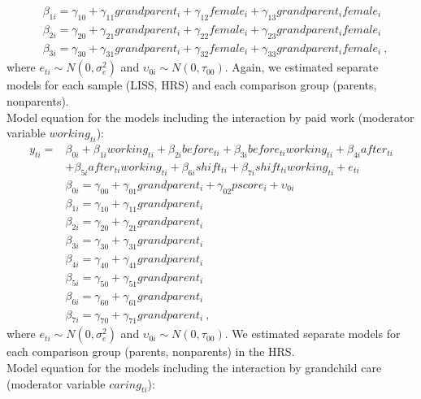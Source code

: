 \documentclass[
  english,
  man, noextraspace,floatsintext]{apa7}
\begin{document}
\begin{appendix}
\begin{equation}
\begin{split}
& \beta_{1i} = \gamma_{10} + \gamma_{11}grandparent_i + \gamma_{12}female_i + \gamma_{13}grandparent_{i}female_{i} \\
& \beta_{2i} = \gamma_{20} + \gamma_{21}grandparent_i + \gamma_{22}female_i + \gamma_{23}grandparent_{i}female_{i} \\
& \beta_{3i} = \gamma_{30} + \gamma_{31}grandparent_i + \gamma_{32}female_i + \gamma_{33}grandparent_{i}female_{i}\ ,
\end{split}
\label{eq:mlm2}
\end{equation} where \(e_{ti} \sim N(0, \sigma_e^2)\) and
\(\upsilon_{0i} \sim N(0, \tau_{00})\). Again, we estimated separate
models for each sample (LISS, HRS) and each comparison group (parents,
nonparents).\\
Model equation for the models including the interaction by paid work
(moderator variable \(working_{ti}\)): \begin{equation}
\begin{split}
y_{ti} =& \beta_{0i} + \beta_{1i}working_{ti} + \beta_{2i}before_{ti} + \beta_{3i}before_{ti}working_{ti} + \beta_{4i}after_{ti} \\
& + \beta_{5i}after_{ti}working_{ti} + \beta_{6i}shift_{ti} + \beta_{7i}shift_{ti}working_{ti} + e_{ti} \\
& \beta_{0i} = \gamma_{00} + \gamma_{01}grandparent_i + \gamma_{02}pscore_i + \upsilon_{0i} \\
& \beta_{1i} = \gamma_{10} + \gamma_{11}grandparent_i \\
& \beta_{2i} = \gamma_{20} + \gamma_{21}grandparent_i \\
& \beta_{3i} = \gamma_{30} + \gamma_{31}grandparent_i \\
& \beta_{4i} = \gamma_{40} + \gamma_{41}grandparent_i \\
& \beta_{5i} = \gamma_{50} + \gamma_{51}grandparent_i \\
& \beta_{6i} = \gamma_{60} + \gamma_{61}grandparent_i \\
& \beta_{7i} = \gamma_{70} + \gamma_{71}grandparent_i\ ,
\end{split}
\label{eq:mlm3}
\end{equation} where \(e_{ti} \sim N(0, \sigma_e^2)\) and
\(\upsilon_{0i} \sim N(0, \tau_{00})\). We estimated separate models for
each comparison group (parents, nonparents) in the HRS.\\
Model equation for the models including the interaction by grandchild
care (moderator variable \(caring_{ti}\)): \begin{equation}

\end{equation}
\end{appendix}
\end{document}
